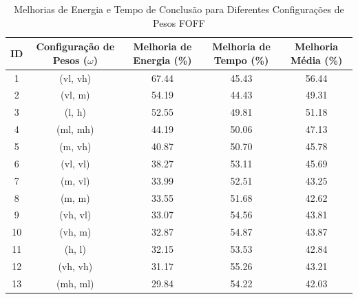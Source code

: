 
    \begin{table}[htbp]
    \centering
    \caption{Melhorias de Energia e Tempo de Conclusão para Diferentes Configurações de Pesos FOFF}
    \label{tab:energy_latency_tradeoff}
    \begin{tabular}{|c|c|c|c|c|}
    \hline
    \textbf{ID} & \textbf{Configuração de Pesos ($\omega$)} & \textbf{Melhoria de Energia (\%)} & \textbf{Melhoria de Tempo (\%)} & \textbf{Melhoria Média (\%)} \\
    \hline
    1 & (vl, vh) & 67.44 & 45.43 & 56.44 \\
\hline
2 & (vl, m) & 54.19 & 44.43 & 49.31 \\
\hline
3 & (l, h) & 52.55 & 49.81 & 51.18 \\
\hline
4 & (ml, mh) & 44.19 & 50.06 & 47.13 \\
\hline
5 & (m, vh) & 40.87 & 50.70 & 45.78 \\
\hline
6 & (vl, vl) & 38.27 & 53.11 & 45.69 \\
\hline
7 & (m, vl) & 33.99 & 52.51 & 43.25 \\
\hline
8 & (m, m) & 33.55 & 51.68 & 42.62 \\
\hline
9 & (vh, vl) & 33.07 & 54.56 & 43.81 \\
\hline
10 & (vh, m) & 32.87 & 54.87 & 43.87 \\
\hline
11 & (h, l) & 32.15 & 53.53 & 42.84 \\
\hline
12 & (vh, vh) & 31.17 & 55.26 & 43.21 \\
\hline
13 & (mh, ml) & 29.84 & 54.22 & 42.03 \\
\hline
\end{tabular}
    \end{table}
    